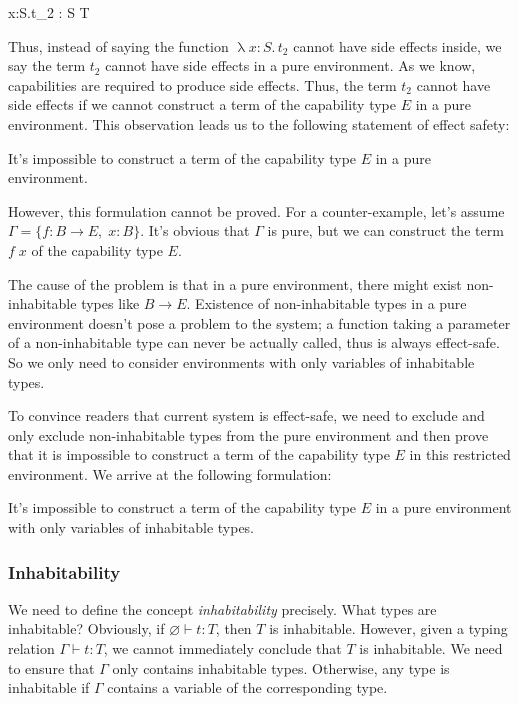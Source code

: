 { \Gamma \vdash \uplambda x{:}S.\;t_2 : S \to T }

Thus, instead of saying the function $\uplambda x{:}S.\, t_2$ cannot
have side effects inside, we say the term $t_2$ cannot have side
effects in a pure environment. As we know, capabilities are required
to produce side effects. Thus, the term $t_2$ cannot have side effects
if we cannot construct a term of the capability type $E$ in a pure
environment. This observation leads us to the following statement of
effect safety:

\begin{definition}
  It's impossible to construct a term of the capability type $E$ in a
  pure environment.
\end{definition}

However, this formulation cannot be proved.  For a counter-example,
let's assume $\Gamma = \{f: B \to E, \; x: B\}$. It's obvious that
$\Gamma$ is pure, but we can construct the term $f \; x$ of the
capability type $E$.

The cause of the problem is that in a pure environment, there might
exist non-inhabitable types like $B \to E$.  Existence of
non-inhabitable types in a pure environment doesn't pose a problem to
the system; a function taking a parameter of a non-inhabitable type
can never be actually called, thus is always effect-safe. So we only
need to consider environments with only variables of inhabitable
types.

To convince readers that current system is effect-safe, we need to
exclude and only exclude non-inhabitable types from the pure
environment and then prove that it is impossible to construct a term
of the capability type $E$ in this restricted environment. We arrive at
the following formulation:

\begin{definition}
  It's impossible to construct a term of the capability type $E$ in a
  pure environment with only variables of inhabitable types.
\end{definition}

\subsubsection{Inhabitability}

We need to define the concept \emph{inhabitability} precisely. What
types are inhabitable? Obviously, if $\varnothing \vdash t: T$, then
$T$ is inhabitable.  However, given a typing relation
$\Gamma \vdash t: T$, we cannot immediately conclude that $T$ is
inhabitable. We need to ensure that $\Gamma$ only contains inhabitable
types. Otherwise, any type is inhabitable if $\Gamma$ contains a
variable of the corresponding type.

